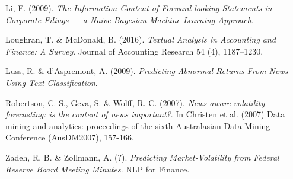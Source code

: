 \documentclass[12pt, a4paper]{article}
\begin{document}
\begin{multicols}{2}
{Li, F. (2009). \textit{The Information Content of Forward-looking Statements in Corporate Filings — a Naive Bayesian Machine Learning Approach}.

Loughran, T. \& McDonald, B. (2016). \textit{Textual Analysis in Accounting and Finance: A Survey}. Journal of Accounting Research 54 (4), 1187–1230.

Luss, R. \& d'Aspremont, A. (2009). \textit{Predicting Abnormal Returns From News Using Text Classification}. 

Robertson, C. S., Geva, S. \& Wolff, R. C. (2007). \textit{News aware volatility forecasting: is the content of news important?}. In Christen et al. (2007) Data mining and analytics: proceedings of the sixth Australasian Data Mining Conference (AusDM2007), 157-166.

Zadeh, R. B. \& Zollmann, A. (?). \textit{Predicting Market-Volatility from Federal Reserve Board Meeting Minutes}. NLP for Finance.
}
\end{multicols}
\end{document}
